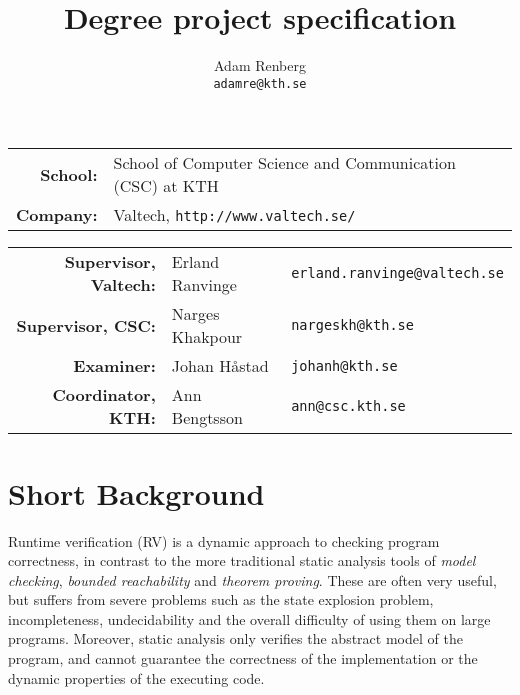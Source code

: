 \documentclass[a4paper,11pt]{article}
\begin{document}
\setlength\parindent{0em}
\setlength\parskip{1em}


\title{Degree project specification}
\author{Adam Renberg\\\texttt{adamre@kth.se}}

\maketitle

\begin{tabular}{rll}
	\textbf{School:}  & School of Computer Science and Communication (CSC) at KTH \\
    \textbf{Company:} & Valtech, \texttt{http://www.valtech.se/} \\
\end{tabular}

\begin{tabular}{rll}
	\textbf{Supervisor, Valtech:} & Erland Ranvinge & \texttt{erland.ranvinge@valtech.se} \\
    \textbf{Supervisor, CSC:}     & Narges Khakpour & \texttt{nargeskh@kth.se} \\
    \textbf{Examiner:}		  & Johan Håstad	& \texttt{johanh@kth.se} \\
    \textbf{Coordinator, KTH:}	  & Ann Bengtsson & \texttt{ann@csc.kth.se} \\
\end{tabular}


\begin{spacing}{1.0}
\setlength\parskip{0.15em}
\tableofcontents
\end{spacing}

\section{Short Background}

Runtime verification (RV) is a dynamic approach to checking program correctness, in contrast to the more 
traditional static analysis tools of \emph{model checking}, \emph{bounded reachability} and \emph{theorem proving}. These are often very useful, but suffers from severe problems such as the
state explosion problem, incompleteness, undecidability and the overall difficulty of using them
on large programs. Moreover, static analysis only verifies the abstract model of the program, and cannot guarantee the correctness of the implementation or the dynamic properties of the executing code.
\end{document}
